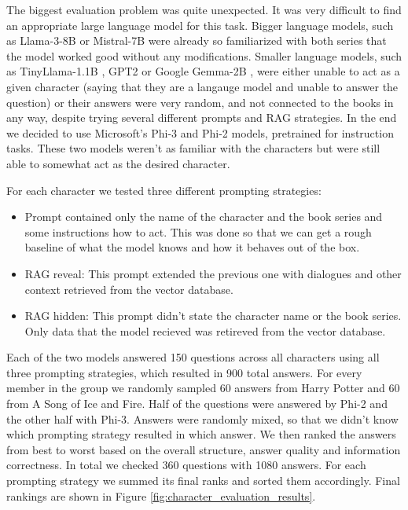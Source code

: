 \documentclass[fleqn,moreauthors,10pt]{ds_report}
\begin{document}
The biggest evaluation problem was quite unexpected. It was very difficult to find an appropriate large language model for this task.
Bigger language models, such as Llama-3-8B \cite{llama3modelcard} or Mistral-7B \cite{jiang2023mistral} were already so familiarized with both series that the model worked good without any modifications.
Smaller language models, such as TinyLlama-1.1B \cite{zhang2024tinyllama}, GPT2 \cite{radford2019language} or Google Gemma-2B \cite{gemma_2024},
were either unable to act as a given character (saying that they are a langauge model and unable to answer the question)
or their answers were very random, and not connected to the books in any way, despite trying several different prompts and RAG strategies.
In the end we decided to use Microsoft's Phi-3 \cite{abdin2024phi} and Phi-2 models, pretrained for instruction tasks.
These two models weren't as familiar with the characters but were still able to somewhat act as the desired character.

For each character we tested three different prompting strategies:
\begin{itemize}
	\item Prompt contained only the name of the character and the book series and some instructions how to act. This was done so that we can get a rough baseline of what the model knows and how it behaves out of the box.
	\item RAG reveal: This prompt extended the previous one with dialogues and other context retrieved from the vector database.
	\item RAG hidden: This prompt didn't state the character name or the book series. Only data that the model recieved was retireved from the vector database.
\end{itemize}

Each of the two models answered 150 questions across all characters using all three prompting strategies, which resulted in 900 total answers.
For every member in the group we randomly sampled 60 answers from Harry Potter and 60 from A Song of Ice and Fire.
Half of the questions were answered by Phi-2 and the other half with Phi-3.
Answers were randomly mixed, so that we didn't know which prompting strategy resulted in which answer.
We then ranked the answers from best to worst based on the overall structure, answer quality and information correctness.
In total we checked 360 questions with 1080 answers.
For each prompting strategy we summed its final ranks and sorted them accordingly.
Final rankings are shown in Figure \ref*{fig:character_evaluation_results}.
\end{document}
